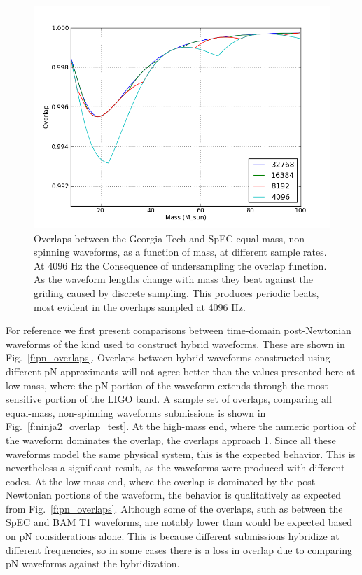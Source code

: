 \begin{figure}
  \includegraphics[width=\linewidth]{figures/ninja2/resolutions}
  \caption[Consequence of undersampling the overlap function]{
  \label{f:overlap_wiggles}
Overlaps between the Georgia Tech and SpEC equal-mass, non-spinning
waveforms, as a function of mass, at different sample rates.  At 4096
Hz the Consequence of undersampling the overlap function.  As the
waveform lengths change with mass they beat against the griding caused
by discrete sampling.  This produces periodic beats, most evident in
the overlaps sampled at 4096 Hz.}
\end{figure}%

For reference we first present comparisons between time-domain
post-Newtonian waveforms of the kind used to construct hybrid
waveforms.  These are shown in Fig.~\ref{f:pn_overlaps}.  Overlaps
between hybrid waveforms constructed using different pN approximants
will not agree better than the values presented here at low mass,
where the pN portion of the waveform extends through the most
sensitive portion of the LIGO band.  A sample set of overlaps,
comparing all equal-mass, non-spinning waveforms submissions is shown
in Fig.~\ref{f:ninja2_overlap_test}.  At the high-mass end, where
the numeric portion of the waveform dominates the overlap, the
overlaps approach 1.   Since all these waveforms model the same
physical system, this is the expected behavior.  This is nevertheless
a significant result, as the waveforms were produced with different
codes.  At the low-mass end, where the overlap is dominated by the
post-Newtonian portions of the waveform, the behavior is qualitatively
as expected from Fig.~\ref{f:pn_overlaps}.  Although some of the
overlaps, such as between the SpEC and BAM T1 waveforms, are notably
lower than would be expected based on pN considerations alone.  This
is because different submissions hybridize at different frequencies,
so in some cases there is a loss in overlap due to comparing pN
waveforms against the hybridization.

